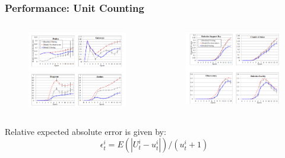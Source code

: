 \documentclass{beamer}
\begin{document}
\begin{frame}
    \frametitle{Performance: Unit Counting}

    \begin{columns}[T]

    \begin{column}{.5\textwidth}

    \begin{figure}[htb]
        \centering
        \includegraphics[width=0.95\linewidth]{sc1.png}
    \end{figure}

    \end{column}

    \begin{column}{.5\textwidth}

        \begin{figure}[htb]
            \centering
            \includegraphics[width=0.95\linewidth]{sc2.png}
        \end{figure} 
        
    \end{column}

    \end{columns}

    Relative expected absolute error is given by:
    $$
    \epsilon_t^i = E(|U_t^i - u_t^i|)/(u_t^i+1)
    $$

\end{frame}
\end{document}
